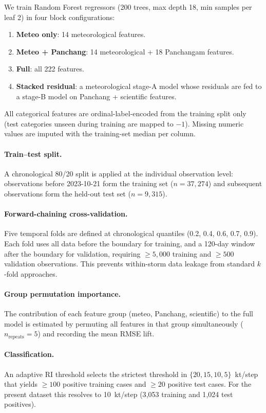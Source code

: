 \documentclass[12pt,a4paper]{article}
\begin{document}
We train Random Forest regressors (200 trees, max depth 18, min samples per
leaf 2) in four block configurations:
\begin{enumerate}
  \item \textbf{Meteo only}: 14 meteorological features.
  \item \textbf{Meteo + Panchang}: 14 meteorological + 18 Panchangam features.
  \item \textbf{Full}: all 222 features.
  \item \textbf{Stacked residual}: a meteorological stage-A model whose residuals
        are fed to a stage-B model on Panchang + scientific features.
\end{enumerate}
All categorical features are ordinal-label-encoded from the training split only
(test categories unseen during training are mapped to $-1$).
Missing numeric values are imputed with the training-set median per column.

\paragraph{Train--test split.} A chronological 80/20 split is applied at the
individual observation level: observations before 2023-10-21 form the training
set ($n = 37{,}274$) and subsequent observations form the held-out test set
($n = 9{,}315$).

\paragraph{Forward-chaining cross-validation.} Five temporal folds are defined
at chronological quantiles (0.2, 0.4, 0.6, 0.7, 0.9).
Each fold uses all data before the boundary for training, and a 120-day window
after the boundary for validation, requiring $\geq 5{,}000$ training and
$\geq 500$ validation observations.
This prevents within-storm data leakage from standard $k$-fold approaches.

\paragraph{Group permutation importance.} The contribution of each feature group
(meteo, Panchang, scientific) to the full model is estimated by permuting all
features in that group simultaneously ($n_\text{repeats} = 5$) and recording
the mean RMSE lift.

\paragraph{Classification.} An adaptive RI threshold selects the strictest
threshold in $\{20, 15, 10, 5\}$~kt/step that yields $\geq 100$ positive
training cases and $\geq 20$ positive test cases.
For the present dataset this resolves to 10~kt/step (3{,}053 training and 1{,}024
test positives).
\end{document}

